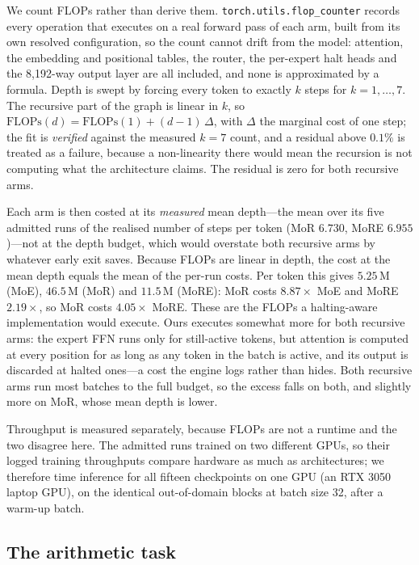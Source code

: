 We count FLOPs rather than derive them. \texttt{torch.utils.flop\_counter} records
every operation that executes on a real forward pass of each arm, built from its
own resolved configuration, so the count cannot drift from the model: attention,
the embedding and positional tables, the router, the per-expert halt heads and the
8{,}192-way output layer are all included, and none is approximated by a formula.
Depth is swept by forcing every token to exactly $k$ steps for $k = 1,\dots,7$.
The recursive part of the graph is linear in $k$, so
$\mathrm{FLOPs}(d) = \mathrm{FLOPs}(1) + (d-1)\,\Delta$, with $\Delta$ the marginal
cost of one step; the fit is \emph{verified} against the measured $k = 7$ count, and
a residual above $0.1\%$ is treated as a failure, because a non-linearity there
would mean the recursion is not computing what the architecture claims. The
residual is zero for both recursive arms.

Each arm is then costed at its \emph{measured} mean depth---the mean over its five
admitted runs of the realised number of steps per token (MoR $6.730$, MoRE
$6.955$)---not at the depth budget, which would overstate both recursive arms by
whatever early exit saves. Because FLOPs are linear in depth, the cost at the mean
depth equals the mean of the per-run costs. Per token this gives
$5.25$\,M (MoE), $46.5$\,M (MoR) and $11.5$\,M (MoRE): MoR costs $8.87\times$ MoE
and MoRE $2.19\times$, so MoR costs $4.05\times$ MoRE. These are the FLOPs a
halting-aware implementation would execute. Ours executes somewhat more for both
recursive arms: the expert FFN runs only for still-active tokens, but attention is
computed at every position for as long as any token in the batch is active, and
its output is discarded at halted ones---a cost the engine logs rather than hides.
Both recursive arms run most batches to the full budget, so the excess falls on
both, and slightly more on MoR, whose mean depth is lower.

Throughput is measured separately, because FLOPs are not a runtime and the two
disagree here. The admitted runs trained on two different GPUs, so their logged
training throughputs compare hardware as much as architectures; we therefore time
inference for all fifteen checkpoints on one GPU (an RTX 3050 laptop GPU), on the
identical out-of-domain blocks at batch size 32, after a warm-up batch.

\subsection{The arithmetic task}
\label{sec:arith-task}

